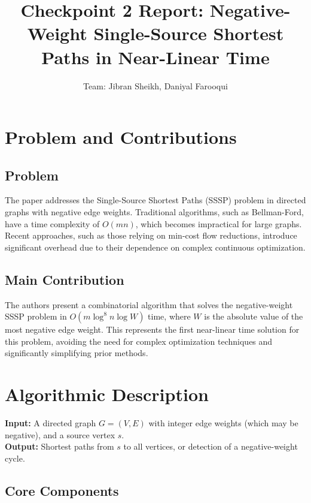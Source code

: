 \documentclass{article}
\title{Checkpoint 2 Report: Negative-Weight Single-Source Shortest Paths in Near-Linear Time}
\author{Team: Jibran Sheikh, Daniyal Farooqui}
\begin{document}
\maketitle

\section{Problem and Contributions}

\subsection{Problem}
The paper addresses the Single-Source Shortest Paths (SSSP) problem in directed graphs with negative edge weights. Traditional algorithms, such as Bellman-Ford, have a time complexity of \( O(mn) \), which becomes impractical for large graphs. Recent approaches, such as those relying on min-cost flow reductions, introduce significant overhead due to their dependence on complex continuous optimization.

\subsection{Main Contribution}
The authors present a combinatorial algorithm that solves the negative-weight SSSP problem in \( O(m \log^8 n \log W) \) time, where \( W \) is the absolute value of the most negative edge weight. This represents the first near-linear time solution for this problem, avoiding the need for complex optimization techniques and significantly simplifying prior methods.

\section{Algorithmic Description}

\textbf{Input:} A directed graph \( G = (V, E) \) with integer edge weights (which may be negative), and a source vertex \( s \). \\
\textbf{Output:} Shortest paths from \( s \) to all vertices, or detection of a negative-weight cycle.

\subsection{Core Components}
\end{document}
